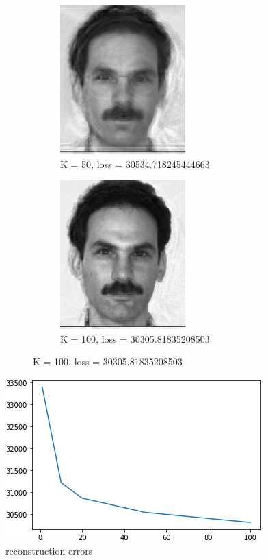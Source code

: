 \documentclass[12pt,letterpaper]{article}
\begin{document}
\begin{figure}
\captionsetup[subfigure]{labelformat=empty}
\centering
\begin{subfigure}{.5\textwidth}
  \centering
  \includegraphics[width=.4\linewidth]{res0250.png}
  \caption{K = 50, loss = 30534.718245444663}
  \label{fig:sub3}
\end{subfigure}%
\begin{subfigure}{.5\textwidth}
  \centering
  \includegraphics[width=.4\linewidth]{res02100.png}
  \caption{K = 100, loss = 30305.81835208503}
  \label{fig:sub4}
\end{subfigure}
\label{fig:test}
\end{figure}

\centering\includegraphics[scale=1]{graph.png}
\\ reconstruction errors
\end{document}
